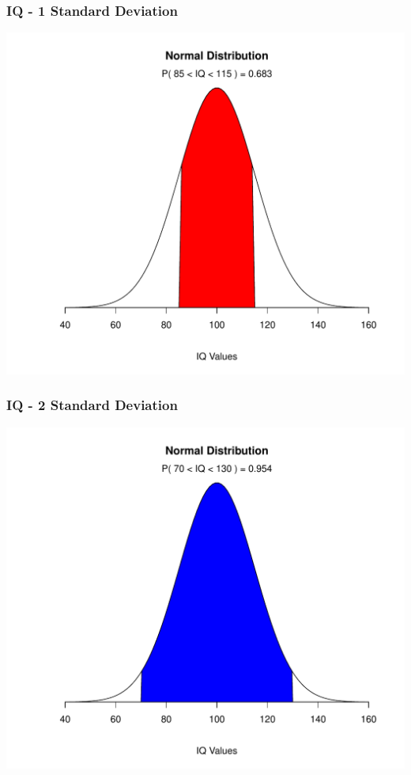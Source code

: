 \documentclass[dvipsnames]{beamer}\usepackage[]{graphicx}\usepackage[]{color}
\makeatletter
\def\maxwidth{ %
  \ifdim\Gin@nat@width>\linewidth
    \linewidth
  \else
    \Gin@nat@width
  \fi
}
\newenvironment{knitrout}{}{} %
\makeatother
\begin{document}
\begin{frame}
\frametitle{IQ - 1 Standard Deviation}
\begin{knitrout}
\color{fgcolor}

{\centering \includegraphics[width=\maxwidth]{figure/unnamed-chunk-10-1} 

}



\end{knitrout}
\end{frame}

\begin{frame}
\frametitle{IQ - 2 Standard Deviation}
\begin{knitrout}
\color{fgcolor}

{\centering \includegraphics[width=\maxwidth]{figure/unnamed-chunk-11-1} 

}



\end{knitrout}
\end{frame}
\end{document}
